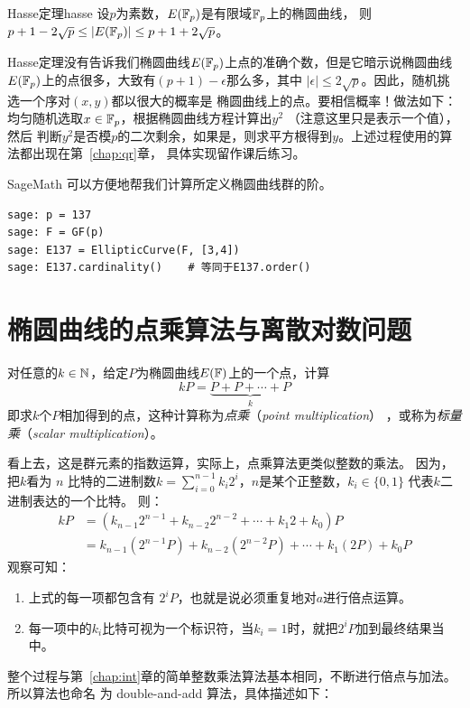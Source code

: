 \begin{theorem}{Hasse定理}{hasse}
设$p$为素数，$E({\mathbb F}_p)$是有限域${\mathbb F}_p$上的椭圆曲线，
则$p + 1- 2 \sqrt{p}  \leq \vert E({\mathbb F}_p) \vert \leq p + 1+ 2 \sqrt{p} $。
\end{theorem}
Hasse定理没有告诉我们椭圆曲线$E({\mathbb F}_p)$上点的准确个数，但是它暗示说椭圆曲线$E({\mathbb F}_p)$上的点很多，大致有$(p + 1) - \epsilon$那么多，其中
$\vert \epsilon \vert \le  2\sqrt{p}$。因此，随机挑选一个序对$(x,y)$都以很大的概率是
椭圆曲线上的点。要相信概率！做法如下：均匀随机选取$x \in {\mathbb F}_p$，根据椭圆曲线方程计算出$y^2$
（注意这里只是表示一个值），然后
判断$y^2$是否模$p$的二次剩余，如果是，则求平方根得到$y$。上述过程使用的算法都出现在第~\ref{chap:qr}章，
具体实现留作课后练习。

SageMath 可以方便地帮我们计算所定义椭圆曲线群的阶。
\begin{lstlisting}
sage: p = 137
sage: F = GF(p)
sage: E137 = EllipticCurve(F, [3,4])
sage: E137.cardinality()    # 等同于E137.order()
\end{lstlisting}

\section{椭圆曲线的点乘算法与离散对数问题}
对任意的$k\in {\mathbb N}$，给定$P$为椭圆曲线$E({\mathbb F})$上的一个点，计算
\[kP = \underbrace{P + P + \cdots + P}_k\]
\noindent 即求$k$个$P$相加得到的点，这种计算称为\emph{点乘}（\emph{point multiplication}）
，或称为\emph{标量乘}（\emph{scalar multiplication}）。

看上去，这是群元素的指数运算，实际上，点乘算法更类似整数的乘法。
因为，把$k$看为 $n$ 比特的二进制数$k = \sum_{i=0}^{n-1} k_i 2^i$，$n$是某个正整数，$k_i \in \{0, 1\}$ 代表$k$二进制表达的一个比特。
则：
\begin{align*}
	      kP &=  (k_{n-1} 2^{n-1}  + k_{n-2} 2^{n-2}  + \cdots + k_1 2 + k_0)P\\
	                      &= k_{n-1}( 2^{n-1}P) + k_{n-2} ( 2^{n-2} P)+ \cdots + k_1( 2P) + k_0 P
\end{align*}
观察可知：
\begin{enumerate}
\item 上式的每一项都包含有 $2^i P$，也就是说必须重复地对$a$进行倍点运算。

\item 每一项中的$k_i$比特可视为一个标识符，当$k_i = 1$时，就把$2^i P$加到最终结果当中。
\end{enumerate}
整个过程与第~\ref{chap:int}章的简单整数乘法算法基本相同，不断进行倍点与加法。所以算法也命名
为 double-and-add 算法，具体描述如下：

